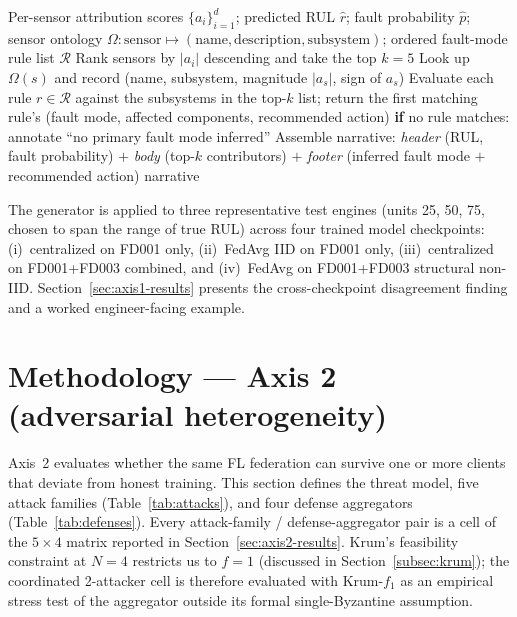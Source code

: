 \documentclass[preprint,12pt,authoryear]{elsarticle}
\begin{document}
\begin{algorithm}[!ht]
\caption{Ontology-grounded engineer narrative from sensor attributions.}
\label{alg:narrative}
\begin{algorithmic}[1]
\Require Per-sensor attribution scores $\{a_i\}_{i=1}^d$; predicted RUL $\hat{r}$; fault probability $\hat{p}$; sensor ontology $\Omega: \text{sensor} \mapsto (\text{name}, \text{description}, \text{subsystem})$; ordered fault-mode rule list $\mathcal{R}$
\State Rank sensors by $|a_i|$ descending and take the top $k = 5$
    \State Look up $\Omega(s)$ and record (name, subsystem, magnitude $|a_s|$, sign of $a_s$)
\EndFor
\State Evaluate each rule $r \in \mathcal{R}$ against the subsystems in the top-$k$ list; return the first matching rule's (fault mode, affected components, recommended action)
\State \textbf{if} no rule matches: annotate ``no primary fault mode inferred''
\State Assemble narrative: \emph{header} (RUL, fault probability) $+$ \emph{body} (top-$k$ contributors) $+$ \emph{footer} (inferred fault mode $+$ recommended action)
\State \Return narrative
\end{algorithmic}
\end{algorithm}

The generator is applied to three representative test engines
(units 25, 50, 75, chosen to span the range of true RUL) across
four trained model checkpoints:
(i)~centralized on FD001 only,
(ii)~FedAvg IID on FD001 only,
(iii)~centralized on FD001+FD003 combined, and
(iv)~FedAvg on FD001+FD003 structural non-IID.
Section~\ref{sec:axis1-results} presents the cross-checkpoint
disagreement finding and a worked engineer-facing example.


\section{Methodology --- Axis 2 (adversarial heterogeneity)}
\label{sec:axis2-method}

Axis~2 evaluates whether the same FL federation can survive one or
more clients that deviate from honest training. This section
defines the threat model, five attack families (Table~\ref{tab:attacks}),
and four defense aggregators (Table~\ref{tab:defenses}). Every
attack-family / defense-aggregator pair is a cell of the
$5 \times 4$ matrix reported in Section~\ref{sec:axis2-results}.
Krum's feasibility constraint at $N = 4$ restricts us to $f = 1$
(discussed in Section~\ref{subsec:krum}); the coordinated 2-attacker
cell is therefore evaluated with Krum-$f_1$ as an empirical stress
test of the aggregator outside its formal single-Byzantine
assumption.
\end{document}
